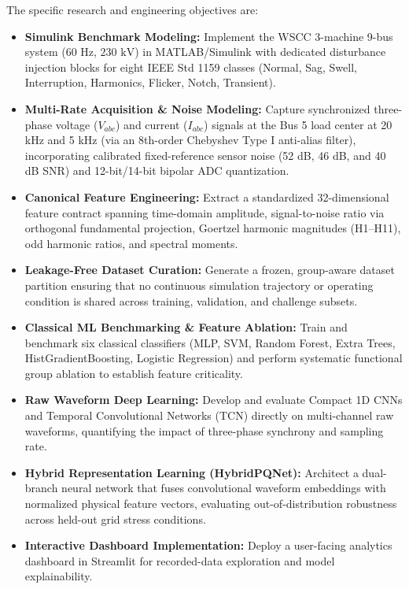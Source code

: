 \documentclass[12pt,a4paper]{report}
\begin{document}
The specific research and engineering objectives are:
\begin{itemize}
    \item \textbf{Simulink Benchmark Modeling:} Implement the WSCC 3-machine 9-bus system ($60\text{ Hz}$, $230\text{ kV}$) in MATLAB/Simulink with dedicated disturbance injection blocks for eight IEEE Std 1159 classes (Normal, Sag, Swell, Interruption, Harmonics, Flicker, Notch, Transient).
    \item \textbf{Multi-Rate Acquisition \& Noise Modeling:} Capture synchronized three-phase voltage ($V_{abc}$) and current ($I_{abc}$) signals at the Bus 5 load center at 20 kHz and 5 kHz (via an 8th-order Chebyshev Type I anti-alias filter), incorporating calibrated fixed-reference sensor noise (52 dB, 46 dB, and 40 dB SNR) and 12-bit/14-bit bipolar ADC quantization.
    \item \textbf{Canonical Feature Engineering:} Extract a standardized 32-dimensional feature contract spanning time-domain amplitude, signal-to-noise ratio via orthogonal fundamental projection, Goertzel harmonic magnitudes (H1--H11), odd harmonic ratios, and spectral moments.
    \item \textbf{Leakage-Free Dataset Curation:} Generate a frozen, group-aware dataset partition ensuring that no continuous simulation trajectory or operating condition is shared across training, validation, and challenge subsets.
    \item \textbf{Classical ML Benchmarking \& Feature Ablation:} Train and benchmark six classical classifiers (MLP, SVM, Random Forest, Extra Trees, HistGradientBoosting, Logistic Regression) and perform systematic functional group ablation to establish feature criticality.
    \item \textbf{Raw Waveform Deep Learning:} Develop and evaluate Compact 1D CNNs and Temporal Convolutional Networks (TCN) directly on multi-channel raw waveforms, quantifying the impact of three-phase synchrony and sampling rate.
    \item \textbf{Hybrid Representation Learning (HybridPQNet):} Architect a dual-branch neural network that fuses convolutional waveform embeddings with normalized physical feature vectors, evaluating out-of-distribution robustness across held-out grid stress conditions.
    \item \textbf{Interactive Dashboard Implementation:} Deploy a user-facing analytics dashboard in Streamlit for recorded-data exploration and model explainability.
\end{itemize}
\end{document}
